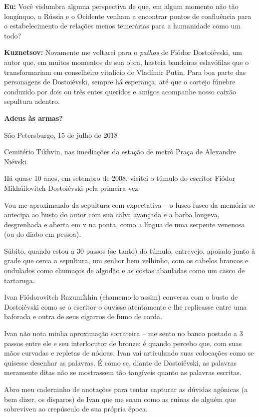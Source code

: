\textbf{Eu:} Você vislumbra alguma perspectiva de que, em algum momento
não tão longínquo, a Rússia e o Ocidente venham a encontrar pontos de
confluência para o estabelecimento de relações menos temerárias para a
humanidade como um todo?

\textbf{Kuznetsov:} Novamente me voltarei para o \emph{pathos} de Fiódor
Dostoiévski, um autor que, em muitos momentos de sua obra, hasteia
bandeiras eslavófilas que o transformariam em conselheiro vitalício de
Vladímir Putin. Para boa parte das personagens de Dostoiévski, sempre há
esperança, até que o cortejo fúnebre conduzido por dois ou três entes
queridos e amigos acompanhe nosso caixão sepultura adentro.

\textbf{Adeus às armas?}

São Petersburgo, 15 de julho de 2018

Cemitério Tikhvin, nas imediações da estação de metrô Praça de Alexandre
Niévski.

Há quase 10 anos, em setembro de 2008, visitei o túmulo do escritor
Fiódor Mikháilovitch Dostoiévski pela primeira vez.

Vou me aproximando da sepultura com expectativa -- o lusco-fusco da
memória se antecipa ao busto do autor com sua calva avançada e a barba
longeva, desgrenhada e aberta em v na ponta, como a língua de uma
serpente venenosa (ou do diabo em pessoa).

Súbito, quando estou a 30 passos (se tanto) do túmulo, entrevejo,
apoiado junto à grade que cerca a sepultura, um senhor bem velhinho, com
os cabelos brancos e ondulados como chumaços de algodão e as costas
abauladas como um casco de tartaruga.

Ivan Fiódorovitch Razumíkhin (chamemo-lo assim) conversa com o busto de
Dostoiévski como se o escritor o ouvisse atentamente e lhe replicasse
entre uma baforada e outra de seus cigarros de fumo de corda.

Ivan não nota minha aproximação sorrateira -- me sento no banco postado
a 3 passos entre ele e seu interlocutor de bronze: é quando percebo que,
com suas mãos curvadas e repletas de nódoas, Ivan vai articulando suas
colocações como se quisesse desenhar as palavras. É como se, diante de
Dostoiévski, as palavras meramente ditas não se mostrassem tão tangíveis
quanto as palavras escritas.

Abro meu caderninho de anotações para tentar capturar as dúvidas
agônicas (a bem dizer, os disparos) de Ivan que me soam como as ruínas
de alguém que sobreviveu ao crepúsculo de sua própria época.

